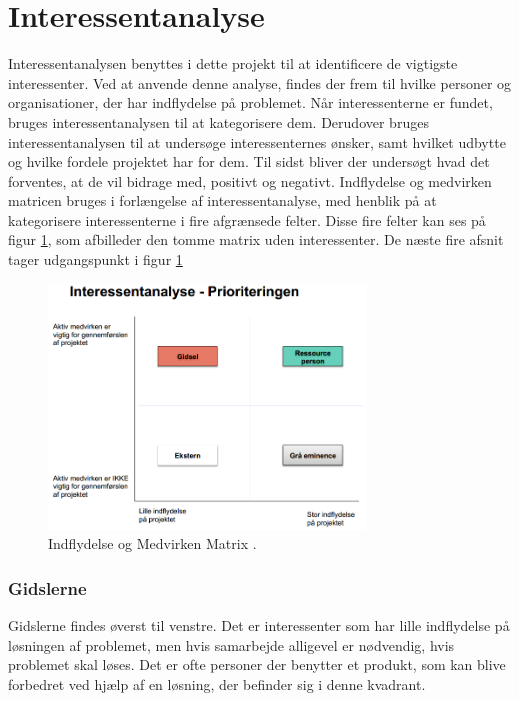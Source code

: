 \section{Interessentanalyse}
Interessentanalysen benyttes i dette projekt til at identificere de vigtigste interessenter. Ved at anvende denne analyse, findes der frem til hvilke personer og organisationer, der har indflydelse på problemet. Når interessenterne er fundet, bruges interessentanalysen til at kategorisere dem. Derudover bruges interessentanalysen til at undersøge interessenternes ønsker, samt hvilket udbytte og hvilke fordele projektet har for dem. Til sidst bliver der undersøgt hvad det forventes, at de vil bidrage med, positivt og negativt.\citep{MetteLindegaardAttrup2008}
Indflydelse og medvirken matricen bruges i forlængelse af interessentanalyse, med henblik på at kategorisere interessenterne i fire afgrænsede felter. Disse fire felter kan ses på figur \ref{fig:PavirkInflydMat}, som afbilleder den tomme matrix uden interessenter. De næste fire afsnit tager udgangspunkt i figur \ref{fig:PavirkInflydMat}

\begin{figure}[H]
    \centering
    \includegraphics[width=0.75\textwidth]{figures/Udklip.PNG}
    \caption{Indflydelse og Medvirken Matrix \citep{Holgaard2014}.} 
    \label{fig:PavirkInflydMat}
\end{figure}

\subsubsection{Gidslerne}
Gidslerne findes øverst til venstre. Det er interessenter som har lille indflydelse på løsningen af problemet, men hvis samarbejde alligevel er nødvendig, hvis problemet skal løses. Det er ofte personer der benytter et produkt, som kan blive forbedret ved hjælp af en løsning, der befinder sig i denne kvadrant.\citep{MetteLindegaardAttrup2008}

